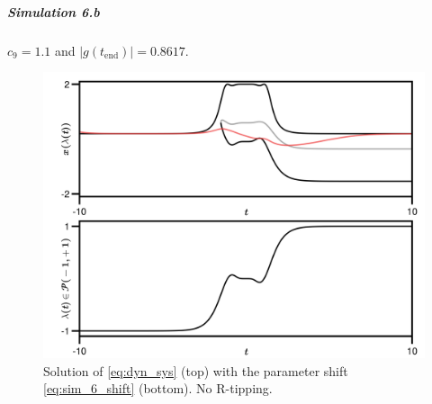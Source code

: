 \documentclass[../main.tex]{subfiles}
\begin{document}
\subparagraph{Simulation 6.b}\label{subpar:sim_6_b}

$c_{9}=1.1$ and $|g(t_{\text{end}})| = 0.8617$.

\begin{figure}[H]
    \centering 
    \includegraphics[keepaspectratio, width=\textwidth]{../figures/sim_6.b.png}
    \caption{Solution of \eqref{eq:dyn_sys} (top) with the parameter shift \eqref{eq:sim_6_shift} (bottom). No R-tipping.}
    \label{fig:sim_6_b}
\end{figure}
\end{document}
